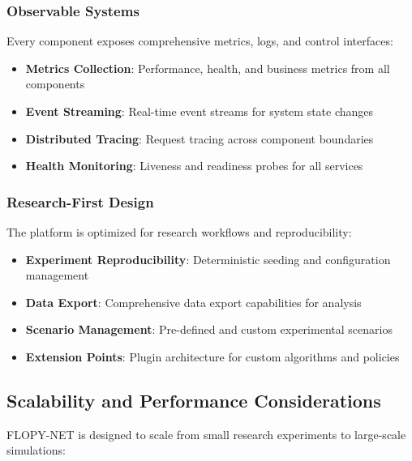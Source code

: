 \subsubsection{Observable Systems}

Every component exposes comprehensive metrics, logs, and control interfaces:

\begin{itemize}
    \item \textbf{Metrics Collection}: Performance, health, and business metrics from all components
    \item \textbf{Event Streaming}: Real-time event streams for system state changes
    \item \textbf{Distributed Tracing}: Request tracing across component boundaries
    \item \textbf{Health Monitoring}: Liveness and readiness probes for all services
\end{itemize}

\subsubsection{Research-First Design}

The platform is optimized for research workflows and reproducibility:

\begin{itemize}
    \item \textbf{Experiment Reproducibility}: Deterministic seeding and configuration management
    \item \textbf{Data Export}: Comprehensive data export capabilities for analysis
    \item \textbf{Scenario Management}: Pre-defined and custom experimental scenarios
    \item \textbf{Extension Points}: Plugin architecture for custom algorithms and policies
\end{itemize}

\subsection{Scalability and Performance Considerations}

FLOPY-NET is designed to scale from small research experiments to large-scale simulations:

